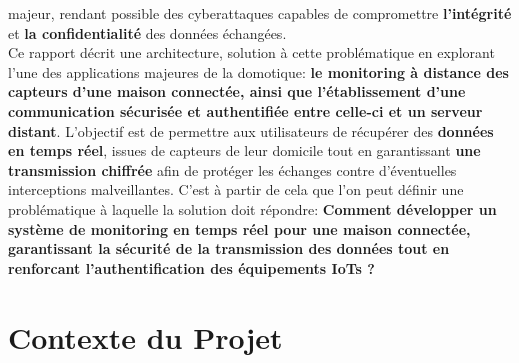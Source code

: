 \documentclass[10pt, a4paper]{report}
\begin{document}
		majeur, rendant possible des cyberattaques capables de compromettre \textbf{l'intégrité} et \textbf{la confidentialité} des 
		données échangées.\\
		Ce rapport décrit une architecture, solution à cette problématique en explorant l'une des applications majeures de la domotique: 
		\textbf{le monitoring à distance des capteurs d'une maison connectée, ainsi que l'établissement d'une communication sécurisée et 
		authentifiée entre celle-ci et un serveur distant}. L'objectif est de permettre aux utilisateurs de récupérer des \textbf{données 
		en temps réel}, issues de capteurs de leur domicile tout en garantissant \textbf{une transmission chiffrée} afin de protéger les 
		échanges contre d'éventuelles interceptions malveillantes. C'est à partir de cela que l'on peut définir une problématique à 
		laquelle la solution doit répondre: \textbf{Comment développer un système de monitoring en temps réel pour une maison connectée, 
		garantissant la sécurité de la transmission des données tout en renforcant l'authentification des équipements IoTs ?}
		
	
	\chapter{Contexte du Projet}
\end{document}
